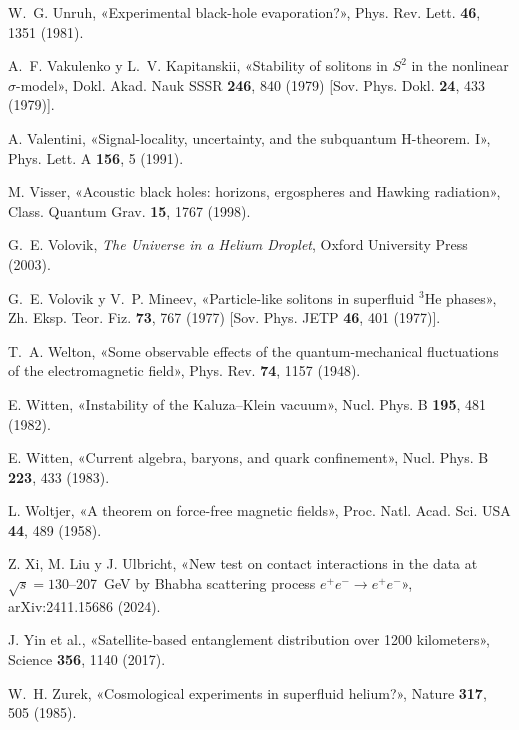 \documentclass[11pt,a4paper]{article}
\begin{document}
\begin{list}{}{\setlength{\leftmargin}{1.5em}\setlength{\itemindent}{-1.5em}\setlength{\itemsep}{0.15em}\small}
\item W.~G. Unruh, «Experimental black-hole evaporation?», Phys. Rev. Lett. \textbf{46}, 1351 (1981).
\item A.~F. Vakulenko y L.~V. Kapitanskii, «Stability of solitons in $S^2$ in the nonlinear $\sigma$-model», Dokl. Akad. Nauk SSSR \textbf{246}, 840 (1979) [Sov. Phys. Dokl. \textbf{24}, 433 (1979)].
\item A. Valentini, «Signal-locality, uncertainty, and the subquantum H-theorem. I», Phys. Lett. A \textbf{156}, 5 (1991).
\item M. Visser, «Acoustic black holes: horizons, ergospheres and Hawking radiation», Class. Quantum Grav. \textbf{15}, 1767 (1998).
\item G.~E. Volovik, \emph{The Universe in a Helium Droplet}, Oxford University Press (2003).
\item G.~E. Volovik y V.~P. Mineev, «Particle-like solitons in superfluid ${}^3$He phases», Zh. Eksp. Teor. Fiz. \textbf{73}, 767 (1977) [Sov. Phys. JETP \textbf{46}, 401 (1977)].
\item T.~A. Welton, «Some observable effects of the quantum-mechanical fluctuations of the electromagnetic field», Phys. Rev. \textbf{74}, 1157 (1948).
\item E. Witten, «Instability of the Kaluza--Klein vacuum», Nucl. Phys. B \textbf{195}, 481 (1982).
\item E. Witten, «Current algebra, baryons, and quark confinement», Nucl. Phys. B \textbf{223}, 433 (1983).
\item L. Woltjer, «A theorem on force-free magnetic fields», Proc. Natl. Acad. Sci. USA \textbf{44}, 489 (1958).
\item Z. Xi, M. Liu y J. Ulbricht, «New test on contact interactions in the data at $\sqrt{s}=130$--207~GeV by Bhabha scattering process $e^+e^-\to e^+e^-$», arXiv:2411.15686 (2024).
\item J. Yin et al., «Satellite-based entanglement distribution over 1200 kilometers», Science \textbf{356}, 1140 (2017).
\item W.~H. Zurek, «Cosmological experiments in superfluid helium?», Nature \textbf{317}, 505 (1985).
\end{list}
\end{document}
